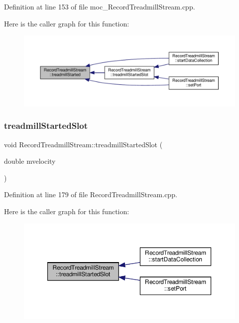 Definition at line 153 of file moc\+\_\+\+Record\+Treadmill\+Stream.\+cpp.

Here is the caller graph for this function\+:
\nopagebreak
\begin{figure}[H]
\begin{center}
\leavevmode
\includegraphics[width=350pt]{class_record_treadmill_stream_afa610ced919405446a8bd28910a9a65e_icgraph}
\end{center}
\end{figure}
\mbox{\label{class_record_treadmill_stream_ac35d01f4cc74269eaecd732d60284e89}} 
\subsubsection{\texorpdfstring{treadmill\+Started\+Slot}{treadmillStartedSlot}}
{\footnotesize\ttfamily void Record\+Treadmill\+Stream\+::treadmill\+Started\+Slot (\begin{DoxyParamCaption}\item[{double}]{mvelocity }\end{DoxyParamCaption})\hspace{0.3cm}{\ttfamily [slot]}}



Definition at line 179 of file Record\+Treadmill\+Stream.\+cpp.

Here is the caller graph for this function\+:
\nopagebreak
\begin{figure}[H]
\begin{center}
\leavevmode
\includegraphics[width=350pt]{class_record_treadmill_stream_ac35d01f4cc74269eaecd732d60284e89_icgraph}
\end{center}
\end{figure}


